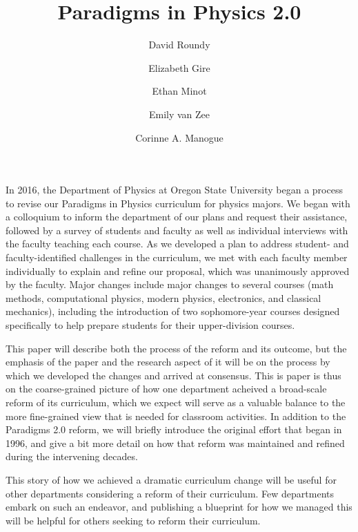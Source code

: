 \documentclass[aps,prstper,reprint]{revtex4-1}
\begin{document}
\title{Paradigms in Physics 2.0}
\author{David Roundy}
\author{Elizabeth Gire}
\author{Ethan Minot}
\author{Emily van Zee}
\author{Corinne A. Manogue}


\maketitle

In 2016, the Department of Physics at Oregon State University began a
process to revise our Paradigms in Physics curriculum for physics
majors.  We began with a colloquium to inform the department of our
plans and request their assistance, followed by a
survey of students and faculty as well as individual interviews with
the faculty teaching each course.  As we developed a plan to
address student- and faculty-identified challenges in the curriculum,
we met with each faculty member individually to explain and refine our
proposal, which was unanimously approved by the faculty.  Major
changes include major changes to several courses (math
methods, computational physics, modern physics, electronics, and
classical mechanics), including the introduction of two sophomore-year
courses designed specifically to help prepare students for their
upper-division courses.

This paper will describe both the process of the reform and its
outcome, but the emphasis of the paper and the research aspect of it
will be on the process by which we developed the changes and arrived
at consensus.  This is paper is thus on the coarse-grained picture of
how one department acheived a broad-scale reform of its curriculum,
which we expect will serve as a valuable balance to the more
fine-grained view that is needed for classroom activities.  In
addition to the Paradigms 2.0 reform, we will briefly introduce the
original effort that began in 1996, and give a bit more detail on how
that reform was maintained and refined during the intervening decades.

This story of how we achieved a dramatic curriculum change will be
useful for other departments considering a reform of their curriculum.
Few departments embark on such an endeavor, and publishing a blueprint
for how we managed this will be helpful for others seeking to reform
their curriculum.
\end{document}
